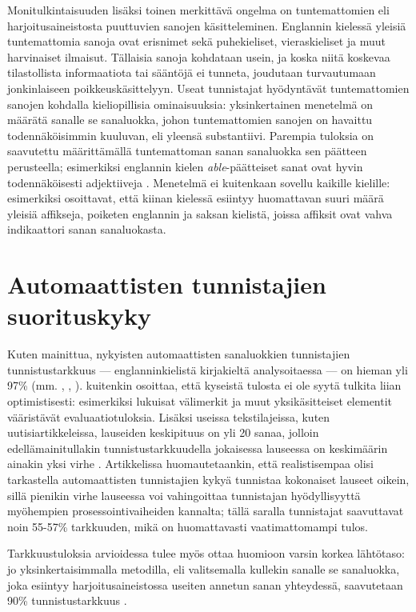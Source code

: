 \documentclass[utf8,bachelor,manualbib]{gradu3}
\begin{document}
Monitulkintaisuuden lisäksi toinen merkittävä ongelma on tuntemattomien eli harjoitusaineistosta puuttuvien sanojen käsitteleminen. Englannin kielessä yleisiä tuntemattomia sanoja ovat erisnimet sekä puhekieliset, vieraskieliset ja muut harvinaiset ilmaisut. Tällaisia sanoja kohdataan usein, ja koska niitä koskevaa tilastollista informaatiota tai sääntöjä ei tunneta, joudutaan turvautumaan jonkinlaiseen poikkeuskäsittelyyn. Useat tunnistajat hyödyntävät tuntemattomien sanojen kohdalla kieliopillisia ominaisuuksia: yksinkertainen menetelmä on määrätä sanalle se sanaluokka, johon tuntemattomien sanojen on havaittu todennäköisimmin kuuluvan, eli yleensä substantiivi. Parempia tuloksia on saavutettu määrittämällä tuntemattoman sanan sanaluokka sen päätteen perusteella; esimerkiksi englannin kielen \emph{able}-päätteiset sanat ovat hyvin todennäköisesti adjektiiveja \citep{samuelsson1993}. Menetelmä ei kuitenkaan sovellu kaikille kielille: esimerkiksi \citet{tseng2005} osoittavat, että kiinan kielessä esiintyy huomattavan suuri määrä yleisiä affikseja, poiketen englannin ja saksan kielistä, joissa affiksit ovat vahva indikaattori sanan sanaluokasta.


\section{Automaattisten tunnistajien suorituskyky}

Kuten mainittua, nykyisten automaattisten sanaluokkien tunnistajien tunnistustarkkuus --- englanninkielistä kirjakieltä analysoitaessa --- on hieman yli 97\%  (mm. \citealp{toutanova2003}, \citealp{shen2007}, \citealp{spoustova2009}). \citet{manning2011} kuitenkin osoittaa, että kyseistä tulosta ei ole syytä tulkita liian optimistisesti: esimerkiksi lukuisat välimerkit ja muut yksikäsitteiset elementit vääristävät evaluaatiotuloksia. Lisäksi useissa tekstilajeissa, kuten uutisiartikkeleissa, lauseiden keskipituus on yli 20 sanaa, jolloin edellämainitullakin tunnistustarkkuudella jokaisessa lauseessa on keskimäärin ainakin yksi virhe \citep{manning1999}. Artikkelissa huomautetaankin, että realistisempaa olisi tarkastella automaattisten tunnistajien kykyä tunnistaa kokonaiset lauseet oikein, sillä pienikin virhe lauseessa voi vahingoittaa tunnistajan hyödyllisyyttä myöhempien prosessointivaiheiden kannalta; tällä saralla tunnistajat saavuttavat noin 55-57\% tarkkuuden, mikä on huomattavasti vaatimattomampi tulos.

Tarkkuustuloksia arvioidessa tulee myös ottaa huomioon varsin korkea lähtötaso: jo yksinkertaisimmalla metodilla, eli valitsemalla kullekin sanalle se sanaluokka, joka esiintyy harjoitusaineistossa useiten annetun sanan yhteydessä, saavutetaan 90\% tunnistustarkkuus \citep{charniak1993}.
\end{document}
